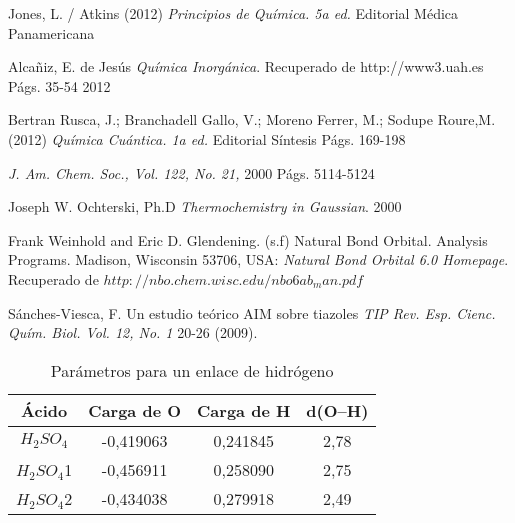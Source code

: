 \begin{thebibliography}{9}

Jones, L. / Atkins (2012)
\textit{Principios de Química. 5a ed.} Editorial Médica Panamericana

Alcañiz, E. de Jesús
\textit{Química Inorgánica}. 
Recuperado de http://www3.uah.es Págs. 35-54
2012

Bertran Rusca, J.; Branchadell Gallo, V.; Moreno Ferrer, M.; Sodupe Roure,M. (2012)
\textit{Química Cuántica. 1a ed.} Editorial Síntesis
Págs. 169-198

\textit{J. Am. Chem. Soc., Vol. 122, No. 21, }
2000 Págs. 5114-5124

Joseph W. Ochterski, Ph.D
\textit{Thermochemistry in Gaussian}.
2000

Frank Weinhold and Eric D. Glendening. (s.f) Natural Bond Orbital. Analysis Programs. Madison, Wisconsin 53706, USA: 
\textit {Natural Bond Orbital 6.0 Homepage}. Recuperado de $http://nbo.chem.wisc.edu/nbo6ab_man.pdf$

Sánches-Viesca, F. Un estudio teórico AIM sobre tiazoles \textit{TIP Rev. Esp. Cienc. Quím. Biol. Vol. 12, No. 1} 20-26 (2009).
\end{thebibliography}

\begin{table}[H]
	\centering
	\begin{tabular}{|c|c|c|c|}
		\hline
		Ácido & Carga de O & Carga de H & d(O--H) \\ \hline
		$H_2SO_4$ & -0,419063 & 0,241845 & 2,78 \\ \hline
		$H_2SO_4$1 & -0,456911 & 0,258090 & 2,75 \\ \hline
		$H_2SO_4$2 & -0,434038 & 0,279918 & 2,49 \\ \hline
	\end{tabular}
	\caption{Parámetros para un enlace de hidrógeno}
\end{table}